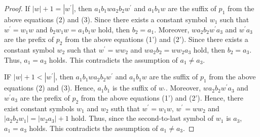 \begin{proof}
\noindent
If $|w|+1=|w^{\prime}|$, then $a_{1}b_{1}wa_{2}b_{2}w^{\prime}$ and $a_{1}b_{1}w$ are the suffix of $p_{1}$ from the above equations (2) and (3).
Since there exists a constant symbol $w_{1}$ such that $w^{\prime}=w_{1}w$ and $b_{2}w_{1}w=a_{1}b_{1}w$ hold,
then $b_{2}=a_{1}$.
Moreover, $wa_{2}b_{2}w^{\prime}a_{3}$ and $w^{\prime}a_{3}$ are the prefix of $p_{2}$ from the above equations (1') and (2').
Since there exists a constant symbol $w_{2}$ such that $w^{\prime}=ww_{2}$ and $wa_{2}b_{2}=ww_{2}a_{3}$ hold,
then $b_{2}=a_{3}$.
Thus, $a_{1} = a_{3}$ holds.
This contradicts the assumption of $a_{1} \ne a_{3}$.

\noindent
IF $|w|+1 < |w^{\prime}|$, then $a_{1}b_{1}wa_{2}b_{2}w^{\prime}$ and $a_{1}b_{1}w$ are the suffix of $p_{1}$ from the above equations (2) and (3).
Hence, $a_{1}b_{1}$ is the suffix of $w_{\prime}$.
Moreover, $wa_{2}b_{2}w^{\prime}a_{3}$ and $w^{\prime}a_{3}$ are the prefix of $p_{2}$ from the above equations (1') and (2').
Hence, there exist constant symbols $w_{1}$ and $w_{2}$ suth that $w^{\prime}=w_{1}w$, $w^{\prime}=ww_{2}$ and $|a_{2}b_{2}w_{1}|=|w_{2}a_{3}|+1$ hold.
Thus, since the second-to-last symbol of $w_{1}$ is $a_{3}$, $a_{1}=a_{3}$ holds.
This contradicts the assumption of $a_{1} \ne a_{3}$.


\end{proof}
